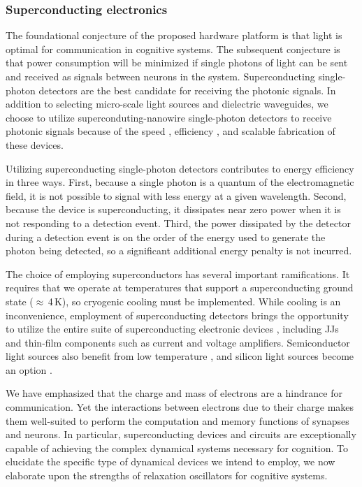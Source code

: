 \documentclass[twocolumn]{article}
\begin{document}
\subsubsection{Superconducting electronics}
The foundational conjecture of the proposed hardware platform is that light is optimal for communication in cognitive systems. The subsequent conjecture is that power consumption will be minimized if single photons of light can be sent and received as signals between neurons in the system. Superconducting single-photon detectors are the best candidate for receiving the photonic signals. In addition to selecting micro-scale light sources and dielectric waveguides, we choose to utilize superconduting-nanowire single-photon detectors \cite{gook2001,nata2012,liyo2013,mave2013} to receive photonic signals because of the speed \cite{yake2007}, efficiency \cite{mave2013}, and scalable fabrication \cite{buch2017} of these devices. 

Utilizing superconducting single-photon detectors contributes to energy efficiency in three ways. First, because a single photon is a quantum of the electromagnetic field, it is not possible to signal with less energy at a given wavelength. Second, because the device is superconducting, it dissipates near zero power when it is not responding to a detection event. Third, the power dissipated by the detector during a detection event is on the order of the energy used to generate the photon being detected, so a significant additional energy penalty is not incurred.

The choice of employing superconductors has several important ramifications. It requires that we operate at temperatures that support a superconducting ground state ($\approx$\,4\,K), so cryogenic cooling must be implemented. While cooling is an inconvenience, employment of superconducting detectors brings the opportunity to utilize the entire suite of superconducting electronic devices \cite{ti1996,vatu1998,ka1999}, including JJs and thin-film components such as current \cite{mcbe2014,mcab2016} and voltage \cite{zhto2018} amplifiers. Semiconductor light sources also benefit from low temperature \cite{doro2017}, and silicon light sources become an option \cite{buch2017}. 

We have emphasized that the charge and mass of electrons are a hindrance for communication. Yet the interactions between electrons due to their charge makes them well-suited to perform the computation and memory functions of synapses and neurons. In particular, superconducting devices and circuits are exceptionally capable of achieving the complex dynamical systems necessary for cognition. To elucidate the specific type of dynamical devices we intend to employ, we now elaborate upon the strengths of relaxation oscillators for cognitive systems.
\end{document}
